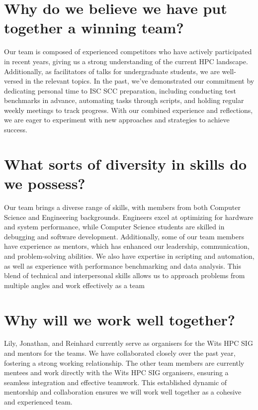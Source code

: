 \documentclass[10pt, onecolumn]{IEEEtran}
\begin{document}
\section{Why do we believe we have put together a winning team?}
\noindent
Our team is composed of experienced competitors who have actively participated in recent years, giving us a strong understanding of the current HPC landscape. Additionally, as facilitators of talks for undergraduate students, we are well-versed in the relevant topics. In the past, we've demonstrated our commitment by dedicating personal time to ISC SCC preparation, including conducting test benchmarks in advance, automating tasks through scripts, and holding regular weekly meetings to track progress. With our combined experience and reflections, we are eager to experiment with new approaches and strategies to achieve success.
\section{What sorts of diversity in skills do we possess?}
\noindent
Our team brings a diverse range of skills, with members from both Computer Science and Engineering backgrounds. Engineers excel at optimizing for hardware and system performance, while Computer Science students are skilled in debugging and software development. Additionally, some of our team members have experience as mentors, which has enhanced our leadership, communication, and problem-solving abilities. We also have expertise in scripting and automation, as well as experience with performance benchmarking and data analysis. This blend of technical and interpersonal skills allows us to approach problems from multiple angles and work effectively as a team
\section{Why will we work well together?} 
\noindent
Lily, Jonathan, and Reinhard currently serve as organisers for the Wits HPC SIG and mentors for the teams. We have collaborated closely over the past year, fostering a strong working relationship. The other team members are currently mentees and work directly with the Wits HPC SIG organisers, ensuring a seamless integration and effective teamwork. This established dynamic of mentorship and collaboration ensures we will work well together as a cohesive and experienced team.
\end{document}
